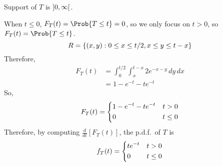 \begin{Example}{}{}
\begin{enumerate}[label=(\roman*)]
              Support of $ T $ is $ \interval[open]{0}{\infty} $.

              When $ t\le 0 $, $ F_T(t)=\Prob{T\le t}=0 $,
              so we only focus on $ t>0 $, so $ F_T(t)=\Prob{T\le t} $.
              \[ R=\{(x,y):0\le x\le t/2, x\le y\le t-x\} \]
              Therefore,
              \begin{align*}
                  F_T(t)
                   & = \int_{0}^{t/2} \int_{x}^{t-x} 2e^{-x-y}\, d{y} \, d{x} \\
                   & =1-e^{-t}-te^{-t}
              \end{align*}
              So,
              \[ F_T(t)=
                  \begin{dcases}
                      1-e^{-t}-te^{-t} & t>0    \\
                      0                & t\le 0
                  \end{dcases} \]
              Therefore, by computing $ \displaystyle
                  \frac{d}{dt}[F_T(t)] $, the p.d.f.\ of $ T $ is
              \[ f_T(t)=
                  \begin{dcases}
                      te^{-t} & t> 0   \\
                      0       & t\le 0
                  \end{dcases} \]
    \end{enumerate}
\end{Example}

